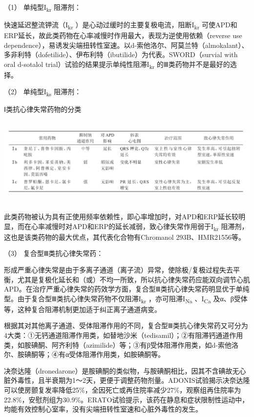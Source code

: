 \hypertarget{text00420.htmlux5cux23CHP17-4-2-3-1}{}
（1） 单纯型I\textsubscript{kr} 阻滞剂：

快速延迟整流钾流（I\textsubscript{kr}
）是心动过缓时的主要复极电流，阻断I\textsubscript{kr}
可使APD和ERP延长，故此类药物在心率减慢时作用最大，表现为逆使用依赖（reverse
use
dependence），易诱发尖端扭转性室速。以d-索他洛尔、阿莫兰特（almokalant）、多非利特（dofetilide）、伊布利特（ibutilide）为代表。SWORD（survial
with oral d-sotalol trial）试验的结果提示单纯性阻滞I\textsubscript{kr}
的Ⅲ类药物并不是最好的选择。

\hypertarget{text00420.htmlux5cux23CHP17-4-2-3-2}{}
（2） 单纯型I\textsubscript{ks} 阻滞剂：

\begin{table}[htbp]
\centering
\caption{Ⅰ类抗心律失常药物的分类}
\label{tab151-2}
\includegraphics[width=6.78125in,height=1.75in]{./images/Image00568.jpg}
\end{table}

此类药物被认为具有正使用频率依赖性，即心率增加时，对APD和ERP延长较明显，而在心率减慢时对APD和ERP的延长减弱，致心律失常作用弱于I\textsubscript{kr}
阻滞剂，这也是该类药物的最大优点，其代表化合物有Chromanol
293B、HMR21556等。

\hypertarget{text00420.htmlux5cux23CHP17-4-2-3-3}{}
（3） 复合型Ⅲ类抗心律失常药：

形成严重心律失常是由于多离子通道（离子流）异常，使除极/复极过程失去平衡，尤其是复极化延长和（或）不均一所致，所以抗心律失常药应能双向调节心肌APD。在治疗严重心律失常的药效学方面，复合型Ⅲ类抗心律失常药明显优于单纯型。由于复合型Ⅲ类抗心律失常药物不仅阻滞I\textsubscript{kr}
，亦可阻滞I\textsubscript{Na} 、I\textsubscript{Ca}
及α、β受体等，这种复合阻滞机制更加适于纠正离子通道病变。

根据其对其他离子通道、受体阻滞作用的不同，复合型Ⅲ类抗心律失常药又可分为4大类：①无钙通道阻滞作用类，如替地沙米（tedisamil）；②有阻滞钙通道作用类，如胺碘酮、阿齐利特（azimilide）等；③有β受体阻滞作用类，如d-索他洛尔、胺碘酮等；④有α受体阻滞作用类，如胺碘酮等。

决奈达隆（dronedarone）是胺碘酮的类似物，与胺碘酮相比，因其不含碘故无心脏外毒性，且半衰期为1～2天，更便于调整药物剂量。ADONIS试验揭示决奈达隆可以使房颤复发率降低25\%，全因死亡或再住院率减少27\%，观察组再住院率为22.8\%，安慰剂组为30.9\%。ERATO试验提示，该药在静息和症状限制性运动中，均能有效控制心室率，没有尖端扭转性室速和心脏外毒性的发生。

